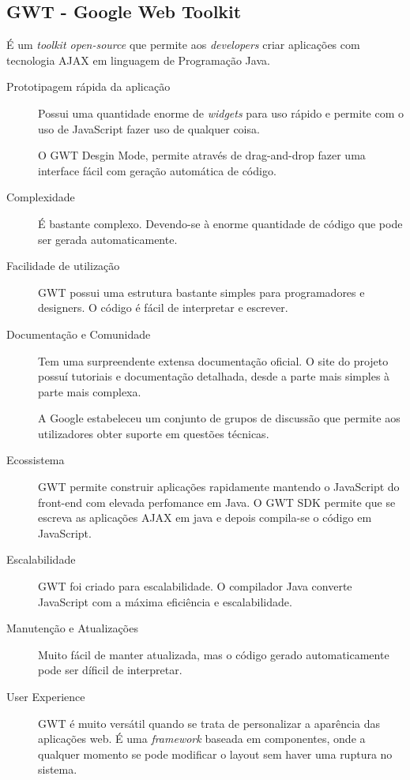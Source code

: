 \subsection{GWT - Google Web Toolkit}

É um \textit{toolkit open-source} que permite aos \textit{developers} criar aplicações com tecnologia AJAX em linguagem de Programação Java.

\begin{description}
\item[Prototipagem rápida da aplicação] Possui uma quantidade enorme de \textit{widgets} para uso rápido e permite com o uso de JavaScript fazer uso de qualquer coisa.

O GWT Desgin Mode, permite através de drag-and-drop fazer uma interface fácil com geração automática de código.

\item[Complexidade] É bastante complexo. Devendo-se à enorme quantidade de código que pode ser gerada automaticamente.

\item[Facilidade de utilização] GWT possui uma estrutura bastante simples para programadores e designers. O código é fácil de interpretar e escrever.

\item[Documentação e Comunidade] Tem uma surpreendente extensa documentação oficial. O site do projeto possuí tutoriais e documentação detalhada, desde a parte mais simples à parte mais complexa.

A Google estabeleceu um conjunto de grupos de discussão que permite aos utilizadores obter suporte em questões técnicas.

\item[Ecossistema] GWT permite construir aplicações rapidamente mantendo o JavaScript do front-end com elevada perfomance em Java. O GWT SDK permite que se escreva as aplicações AJAX em java e depois compila-se o código em JavaScript.

\item[Escalabilidade] GWT foi criado para escalabilidade. O compilador Java converte JavaScript com a máxima eficiência e escalabilidade.

\item[Manutenção e Atualizações] Muito fácil de manter atualizada, mas o código gerado automaticamente pode ser díficil de interpretar.

\item[User Experience] GWT é muito versátil quando se trata de personalizar a aparência das aplicações web. É uma \textit{framework} baseada em componentes, onde a qualquer momento se pode modificar o layout sem haver uma ruptura no sistema.
\end{description}


